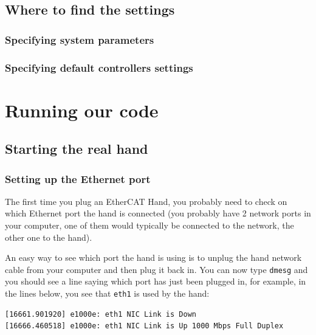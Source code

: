 \documentclass[12pt]{article}
\begin{document}
\subsection{Where to find the settings}
\label{sec:where-find-settings}

\subsubsection{Specifying system parameters}
\label{sec:spec-system-param}

\subsubsection{Specifying default controllers settings}
\label{sec:spec-defa-contr}

\newpage

\section{Running our code}
\label{sec:running-our-code}

\subsection{Starting the real hand}
\label{sec:starting-real-hand}

\subsubsection{Setting up the Ethernet port}
\par The first time you plug an EtherCAT Hand, you probably need to check on which Ethernet port the hand is connected (you probably have 2 network ports in your computer, one of them would typically be connected to the network, the other one to the hand).

\par An easy way to see which port the hand is using is to unplug the hand network cable from your computer and then plug it back in. You can now type \texttt{dmesg} and you should see a line saying which port has just been plugged in, for example, in the lines below, you see that \texttt{eth1} is used by the hand:
  \begin{lstlisting}[escapeinside='']
[16661.901920] e1000e: eth1 NIC Link is Down
[16666.460518] e1000e: eth1 NIC Link is Up 1000 Mbps Full Duplex
  \end{lstlisting}
\end{document}
